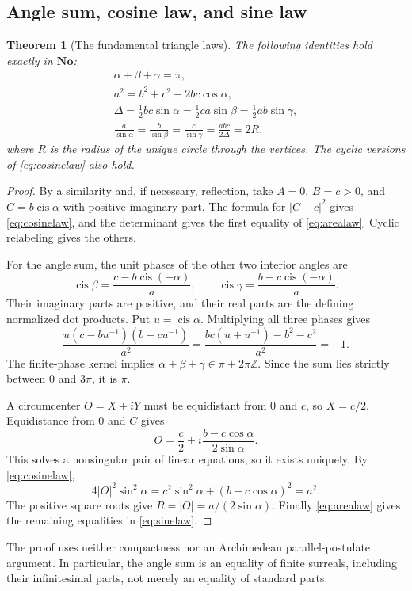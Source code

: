 \documentclass[11pt,letterpaper]{article}
\newtheorem{theorem}{Theorem}[section]
\theoremstyle{definition}
\theoremstyle{remark}
\newcommand{\No}{\mathbf{No}}
\newcommand{\Z}{\mathbb Z}\newcommand{\N}{\mathbb N}
\newcommand{\cis}{\operatorname{cis}}
\numberwithin{equation}{section}
\begin{document}
\subsection{Angle sum, cosine law, and sine law}
\begin{theorem}[The fundamental triangle laws]\label{thm:trianglelaws}
The following identities hold exactly in $\No$:
\begin{gather}
 \alpha+\beta+\gamma=\pi,\label{eq:anglesum}\\
 a^2=b^2+c^2-2bc\cos\alpha,\label{eq:cosinelaw}\\
 \Delta=\tfrac12bc\sin\alpha
       =\tfrac12ca\sin\beta
       =\tfrac12ab\sin\gamma,\label{eq:arealaw}\\
 \frac a{\sin\alpha}=\frac b{\sin\beta}
 =\frac c{\sin\gamma}=\frac{abc}{2\Delta}=2R,\label{eq:sinelaw}
\end{gather}
where $R$ is the radius of the unique circle through the vertices. The cyclic versions of \eqref{eq:cosinelaw} also hold.
\end{theorem}
\begin{proof}
By a similarity and, if necessary, reflection, take $A=0$, $B=c>0$, and $C=b\cis\alpha$ with positive imaginary part. The formula for $|C-c|^2$ gives \eqref{eq:cosinelaw}, and the determinant gives the first equality of \eqref{eq:arealaw}. Cyclic relabeling gives the others.

For the angle sum, the unit phases of the other two interior angles are
\[
 \cis\beta=\frac{c-b\cis(-\alpha)}a,\qquad
 \cis\gamma=\frac{b-c\cis(-\alpha)}a.
\]
Their imaginary parts are positive, and their real parts are the defining normalized dot products. Put $u=\cis\alpha$. Multiplying all three phases gives
\[
 \frac{u(c-bu^{-1})(b-cu^{-1})}{a^2}
 =\frac{bc(u+u^{-1})-b^2-c^2}{a^2}=-1.
\]
The finite-phase kernel implies $\alpha+\beta+\gamma\in\pi+2\pi\Z$. Since the sum lies strictly between $0$ and $3\pi$, it is $\pi$.

A circumcenter $O=X+iY$ must be equidistant from $0$ and $c$, so $X=c/2$. Equidistance from $0$ and $C$ gives
\[
 O=\frac c2+i\frac{b-c\cos\alpha}{2\sin\alpha}.
\]
This solves a nonsingular pair of linear equations, so it exists uniquely. By \eqref{eq:cosinelaw},
\[
 4|O|^2\sin^2\alpha
 =c^2\sin^2\alpha+(b-c\cos\alpha)^2=a^2.
\]
The positive square roots give $R=|O|=a/(2\sin\alpha)$. Finally \eqref{eq:arealaw} gives the remaining equalities in \eqref{eq:sinelaw}.
\end{proof}
The proof uses neither compactness nor an Archimedean parallel-postulate argument. In particular, the angle sum is an equality of finite surreals, including their infinitesimal parts, not merely an equality of standard parts.
\end{document}
